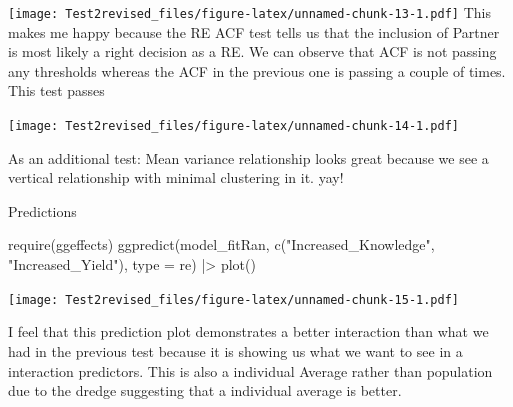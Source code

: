 \documentclass[
]{article}
\newenvironment{Shaded}{\begin{snugshade}}{\end{snugshade}}
\newcommand{\AttributeTok}[1]{\textcolor[rgb]{0.77,0.63,0.00}{#1}}
\newcommand{\FloatTok}[1]{\textcolor[rgb]{0.00,0.00,0.81}{#1}}
\newcommand{\FunctionTok}[1]{\textcolor[rgb]{0.00,0.00,0.00}{#1}}
\newcommand{\NormalTok}[1]{#1}
\newcommand{\OtherTok}[1]{\textcolor[rgb]{0.56,0.35,0.01}{#1}}
\newcommand{\SpecialCharTok}[1]{\textcolor[rgb]{0.00,0.00,0.00}{#1}}
\newcommand{\StringTok}[1]{\textcolor[rgb]{0.31,0.60,0.02}{#1}}
\begin{document}
\texttt{[image: Test2revised\_files/figure-latex/unnamed-chunk-13-1.pdf]}
This makes me happy because the RE ACF test tells us that the inclusion
of Partner is most likely a right decision as a RE. We can observe that
ACF is not passing any thresholds whereas the ACF in the previous one is
passing a couple of times. This test passes

\begin{Shaded}
\end{Shaded}

\texttt{[image: Test2revised\_files/figure-latex/unnamed-chunk-14-1.pdf]}

As an additional test: Mean variance relationship looks great because we
see a vertical relationship with minimal clustering in it. yay!

Predictions

\begin{Shaded}
\begin{Highlighting}[]
\FunctionTok{require}\NormalTok{(ggeffects)}
\FunctionTok{ggpredict}\NormalTok{(model\_fitRan, }
          \FunctionTok{c}\NormalTok{(}\StringTok{"Increased\_Knowledge"}\NormalTok{, }\StringTok{"Increased\_Yield"}\NormalTok{), }
          \AttributeTok{type =} \StringTok{\textquotesingle{}re\textquotesingle{}}\NormalTok{) }\SpecialCharTok{|\textgreater{}} 
  \FunctionTok{plot}\NormalTok{() }
\end{Highlighting}
\end{Shaded}

\texttt{[image: Test2revised\_files/figure-latex/unnamed-chunk-15-1.pdf]}

I feel that this prediction plot demonstrates a better interaction than
what we had in the previous test because it is showing us what we want
to see in a interaction predictors. This is also a individual Average
rather than population due to the dredge suggesting that a individual
average is better.
\end{document}

